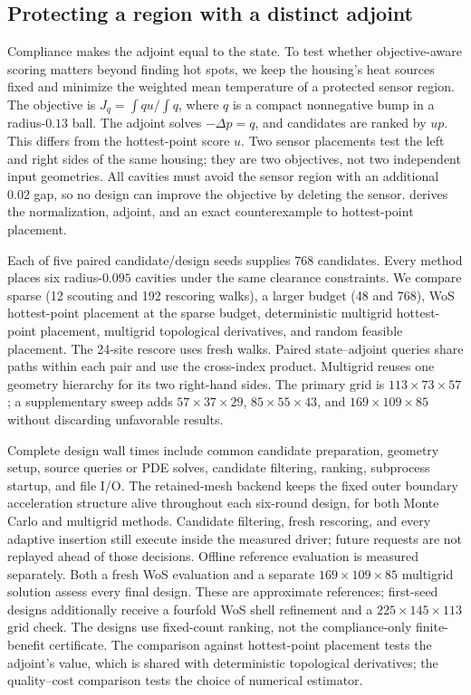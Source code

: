 \subsection{Protecting a region with a distinct adjoint}
\label{sec:regional}

Compliance makes the adjoint equal to the state. To test whether
objective-aware scoring matters beyond finding hot spots, we keep the
housing's heat sources fixed and minimize the weighted mean temperature
of a protected sensor region. The objective is
$J_q=\int q u/\int q$, where $q$ is a compact nonnegative bump in
a radius-$0.13$ ball. The adjoint solves $-\Delta p=q$, and candidates
are ranked by $up$. This differs from the hottest-point score $u$.
Two sensor placements test the left and right sides of the same housing;
they are two objectives, not two independent input geometries.
All cavities must avoid the sensor region with an additional $0.02$
gap, so no design can improve the objective by deleting the sensor.
 derives the normalization, adjoint, and an exact
counterexample to hottest-point placement.

Each of five paired candidate/design seeds supplies 768 candidates.
Every method places six radius-$0.095$ cavities under the same clearance
constraints. We compare sparse \method{} (12 scouting and 192 rescoring
walks), a larger budget (48 and 768), WoS hottest-point placement at the
sparse budget, deterministic multigrid hottest-point placement,
multigrid topological derivatives, and random feasible placement.
The 24-site rescore uses fresh walks. Paired state--adjoint queries
share paths within each pair and use the cross-index product.
Multigrid reuses one geometry hierarchy for its two right-hand sides.
The primary grid is $113\times73\times57$; a supplementary sweep
adds $57\times37\times29$, $85\times55\times43$, and
$169\times109\times85$ without discarding unfavorable results.



Complete design wall times include common candidate preparation,
geometry setup, source queries or PDE solves, candidate filtering,
ranking, subprocess startup, and file I/O. The retained-mesh backend
keeps the fixed outer boundary acceleration structure alive throughout
each six-round design, for both Monte Carlo and multigrid methods.
Candidate filtering, fresh rescoring, and every adaptive insertion still
execute inside the measured driver; future requests are not replayed
ahead of those decisions. Offline reference evaluation
is measured separately. Both a fresh WoS evaluation and a separate
$169\times109\times85$ multigrid solution assess every final design.
These are approximate references; first-seed designs additionally
receive a fourfold WoS shell refinement and a $225\times145\times113$
grid check. The designs use fixed-count ranking, not the
compliance-only finite-benefit certificate. The comparison against
hottest-point placement tests the adjoint's value, which is shared
with deterministic topological derivatives; the quality--cost
comparison tests the choice of numerical estimator.


